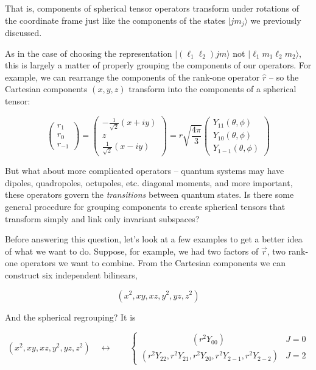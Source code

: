 That is, components of spherical tensor operators transform under rotations of
the coordinate frame just like the components of the states $|jm_j\rangle$ we
previously discussed. 

As in the case of choosing the representation $|(\ell_1\ell_2) jm\rangle$ not
$|\ell_1m_1\ell_2m_2\rangle$, this is largely a matter of properly grouping the
components of our operators. For example, we can rearrange the components of
the rank-one operator $\hat{r}$ -- so the Cartesian components $(x, y, z)$
transform into the components of a spherical tensor: 

\[
\begin{pmatrix}
  r_1 \\ r_0\\ r_{-1} 
\end{pmatrix} = \begin{pmatrix}
  -\frac{1}{\sqrt{2}} (x + iy) \\ z \\ \frac{1}{\sqrt{2}} (x - iy)
\end{pmatrix} = r\sqrt{\frac{4\pi}{3}} \begin{pmatrix}
Y_{11}(\theta, \phi) \\ Y_{10} (\theta, \phi) \\ Y_{1-1} (\theta, \phi)
\end{pmatrix}   
\] \vspace{3px}

But what about more complicated operators -- quantum systems may have dipoles,
quadropoles, octupoles, etc. diagonal moments, and more important, these
operators govern the \textit{transitions} between quantum states. Is there some
general procedure for grouping components to create spherical tensors that
transform simply and link only invariant subspaces? 

Before answering this question, let's look at a few examples to get a better
idea of what we want to do. Suppose, for example, we had two factors of
$\vec{r}$, two rank-one operators we want to combine. From the Cartesian
components we  can construct six independent bilinears, 

\[
  (x^2, xy, xz, y^2, yz, z^2) 
\] \vspace{3px}

And the spherical regrouping? It is 

\[
  (x^2, xy, xz, y^2, yz, z^2) \quad \leftrightarrow \qquad \begin{cases}
    \qquad \qquad \qquad (r^2Y_{00}) &J = 0 \\ (r^2 Y_{22}, r^2 Y_{21}, r^2Y_{20}, r^2Y_{2-1},
    r^2Y_{2-2}) &J=2
  \end{cases} 
\] \vspace{3px}

